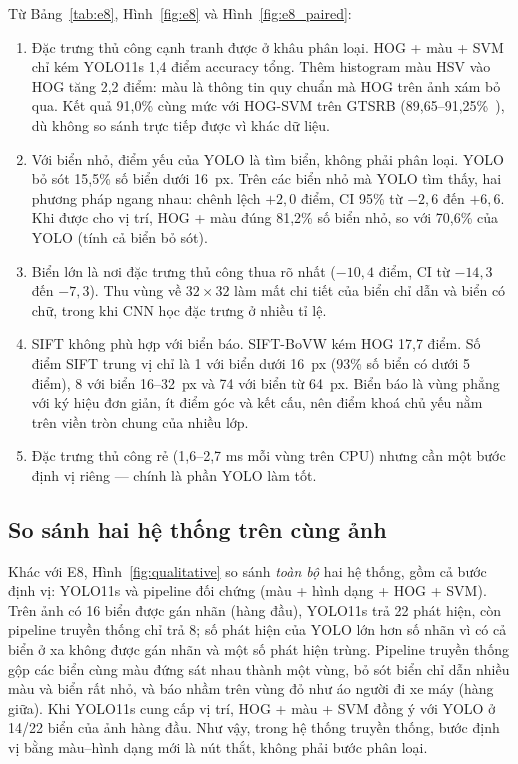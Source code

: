 Từ Bảng~\ref{tab:e8}, Hình~\ref{fig:e8} và Hình~\ref{fig:e8_paired}:
\begin{enumerate}
 \item Đặc trưng thủ công cạnh tranh được ở khâu phân loại. HOG + màu + SVM chỉ kém YOLO11s 1,4 điểm accuracy tổng. Thêm histogram màu HSV vào HOG tăng 2,2 điểm: màu là thông tin quy chuẩn mà HOG trên ảnh xám bỏ qua. Kết quả 91,0\% cùng mức với HOG-SVM trên GTSRB (89,65--91,25\%~\cite{vieira2025hogsvm}), dù không so sánh trực tiếp được vì khác dữ liệu.
 \item Với biển nhỏ, điểm yếu của YOLO là tìm biển, không phải phân loại. YOLO bỏ sót 15,5\% số biển dưới 16~px. Trên các biển nhỏ mà YOLO tìm thấy, hai phương pháp ngang nhau: chênh lệch $+2{,}0$ điểm, CI 95\% từ $-2{,}6$ đến $+6{,}6$. Khi được cho vị trí, HOG + màu đúng 81,2\% số biển nhỏ, so với 70,6\% của YOLO (tính cả biển bỏ sót).
 \item Biển lớn là nơi đặc trưng thủ công thua rõ nhất ($-10{,}4$ điểm, CI từ $-14{,}3$ đến $-7{,}3$). Thu vùng về $32\times32$ làm mất chi tiết của biển chỉ dẫn và biển có chữ, trong khi CNN học đặc trưng ở nhiều tỉ lệ.
 \item SIFT không phù hợp với biển báo. SIFT-BoVW kém HOG 17,7 điểm. Số điểm SIFT trung vị chỉ là 1 với biển dưới 16~px (93\% số biển có dưới 5 điểm), 8 với biển 16--32~px và 74 với biển từ 64~px. Biển báo là vùng phẳng với ký hiệu đơn giản, ít điểm góc và kết cấu, nên điểm khoá chủ yếu nằm trên viền tròn chung của nhiều lớp.
 \item Đặc trưng thủ công rẻ (1,6--2,7 ms mỗi vùng trên CPU) nhưng cần một bước định vị riêng --- chính là phần YOLO làm tốt.
\end{enumerate}

\subsection{So sánh hai hệ thống trên cùng ảnh}
Khác với E8, Hình~\ref{fig:qualitative} so sánh \textit{toàn bộ} hai hệ thống, gồm cả bước định vị: YOLO11s và pipeline đối chứng (màu + hình dạng + HOG + SVM). Trên ảnh có 16 biển được gán nhãn (hàng đầu), YOLO11s trả 22 phát hiện, còn pipeline truyền thống chỉ trả 8; số phát hiện của YOLO lớn hơn số nhãn vì có cả biển ở xa không được gán nhãn và một số phát hiện trùng. Pipeline truyền thống gộp các biển cùng màu đứng sát nhau thành một vùng, bỏ sót biển chỉ dẫn nhiều màu và biển rất nhỏ, và báo nhầm trên vùng đỏ như áo người đi xe máy (hàng giữa). Khi YOLO11s cung cấp vị trí, HOG + màu + SVM đồng ý với YOLO ở 14/22 biển của ảnh hàng đầu. Như vậy, trong hệ thống truyền thống, bước định vị bằng màu--hình dạng mới là nút thắt, không phải bước phân loại.

